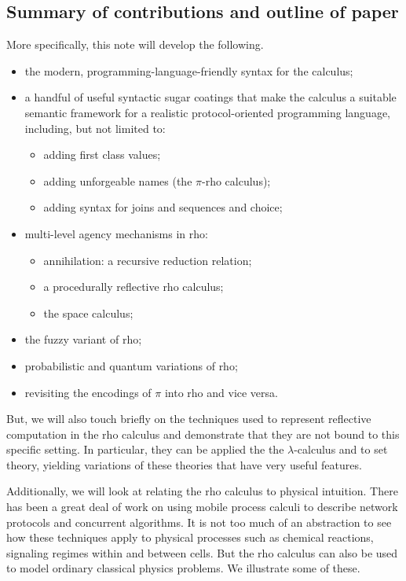 \subsection{Summary of contributions and outline of paper}
More specifically, this note will develop the following.
\begin{itemize}
  \item the modern, programming-language-friendly syntax for the calculus;
  \item a handful of useful syntactic sugar coatings that make the
    calculus a suitable semantic framework for a realistic
    protocol-oriented programming language, including, but not limited
    to:
    \begin{itemize}
      \item adding first class values;
      \item adding unforgeable names (the $\pi$-rho calculus);
      \item adding syntax for joins and sequences and choice;
    \end{itemize}
  \item multi-level agency mechanisms in rho:
    \begin{itemize}
        \item annihilation: a recursive reduction relation;
        \item a procedurally reflective rho calculus;
        \item the space calculus;
    \end{itemize}
  \item the fuzzy variant of rho;
  \item probabilistic and quantum variations of rho;
  \item revisiting the encodings of $\pi$ into rho and vice versa.
\end{itemize}

But, we will also touch briefly on the techniques used to represent
reflective computation in the rho calculus and demonstrate that they
are not bound to this specific setting. In particular, they can be
applied the the $\lambda$-calculus and to set theory, yielding
variations of these theories that have very useful features.

Additionally, we will look at relating the rho calculus to physical
intuition. There has been a great deal of work on using mobile process
calculi to describe network protocols and concurrent algorithms. It is
not too much of an abstraction to see how these techniques apply to
physical processes such as chemical reactions, signaling regimes
within and between cells. But the rho calculus can also be used to
model ordinary classical physics problems. We illustrate some of
these.

